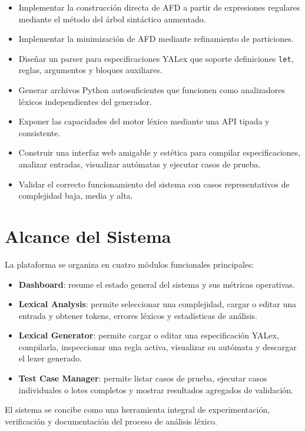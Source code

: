 \documentclass[12pt,a4paper]{article}
\begin{document}
\begin{itemize}[leftmargin=2em]
  \item Implementar la construcción directa de AFD a partir de expresiones regulares mediante el método del árbol sintáctico aumentado.
  \item Implementar la minimización de AFD mediante refinamiento de particiones.
  \item Diseñar un parser para especificaciones YALex que soporte definiciones \texttt{let}, reglas, argumentos y bloques auxiliares.
  \item Generar archivos Python autosuficientes que funcionen como analizadores léxicos independientes del generador.
  \item Exponer las capacidades del motor léxico mediante una API tipada y consistente.
  \item Construir una interfaz web amigable y estética para compilar especificaciones, analizar entradas, visualizar autómatas y ejecutar casos de prueba.
  \item Validar el correcto funcionamiento del sistema con casos representativos de complejidad baja, media y alta.
\end{itemize}

\section{Alcance del Sistema}

La plataforma se organiza en cuatro módulos funcionales principales:

\begin{itemize}[leftmargin=2em]
  \item \textbf{Dashboard}: resume el estado general del sistema y sus métricas operativas.
  \item \textbf{Lexical Analysis}: permite seleccionar una complejidad, cargar o editar una entrada y obtener tokens, errores léxicos y estadísticas de análisis.
  \item \textbf{Lexical Generator}: permite cargar o editar una especificación YALex, compilarla, inspeccionar una regla activa, visualizar su autómata y descargar el lexer generado.
  \item \textbf{Test Case Manager}: permite listar casos de prueba, ejecutar casos individuales o lotes completos y mostrar resultados agregados de validación.
\end{itemize}

El sistema se concibe como una herramienta integral de experimentación, verificación y documentación del proceso de análisis léxico.
\end{document}
